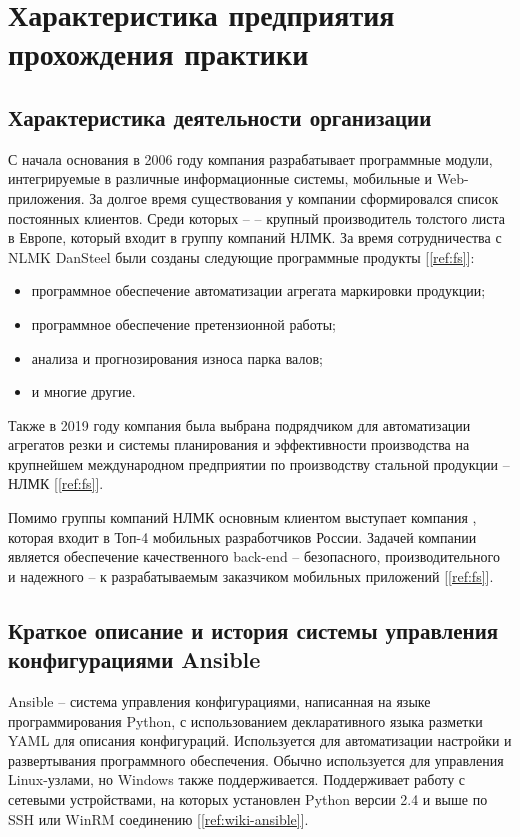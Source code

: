 \section{Характеристика предприятия прохождения практики}
\subsection{Характеристика деятельности организации}
С начала основания в 2006 году компания  разрабатывает
программные модули, интегрируемые в различные информационные системы, мобильные
и Web- приложения. За долгое время существования у компании сформировался список
постоянных клиентов. Среди которых --  -- крупный
производитель толстого листа в Европе, который входит в группу компаний НЛМК. За
время сотрудничества с NLMK DanSteel были созданы следующие программные
продукты [\ref{ref:fs}]:
\begin{itemize}
    \item программное обеспечение автоматизации агрегата маркировки продукции;
    \item программное обеспечение претензионной работы;
    \item анализа и прогнозирования износа парка валов;
    \item и многие другие.
\end{itemize}

Также в 2019 году компания была выбрана подрядчиком для автоматизации агрегатов
резки и системы планирования и эффективности производства на крупнейшем
международном предприятии по производству стальной продукции -- НЛМК [\ref{ref:fs}].

Помимо группы компаний НЛМК основным клиентом  выступает
компания , которая входит в Топ-4 мобильных разработчиков
России. Задачей компании является обеспечение качественного back-end --
безопасного, производительного и надежного -- к разрабатываемым заказчиком
мобильных приложений [\ref{ref:fs}].

\subsection{Краткое описание и история системы управления конфигурациями Ansible}
Ansible -- система управления конфигурациями, написанная на языке
программирования Python, с использованием декларативного языка разметки YAML для
описания конфигураций. Используется для автоматизации настройки и развертывания
программного обеспечения. Обычно используется для управления Linux-узлами, но
Windows также поддерживается. Поддерживает работу с сетевыми устройствами, на
которых установлен Python версии 2.4 и выше по SSH или WinRM соединению
[\ref{ref:wiki-ansible}].

